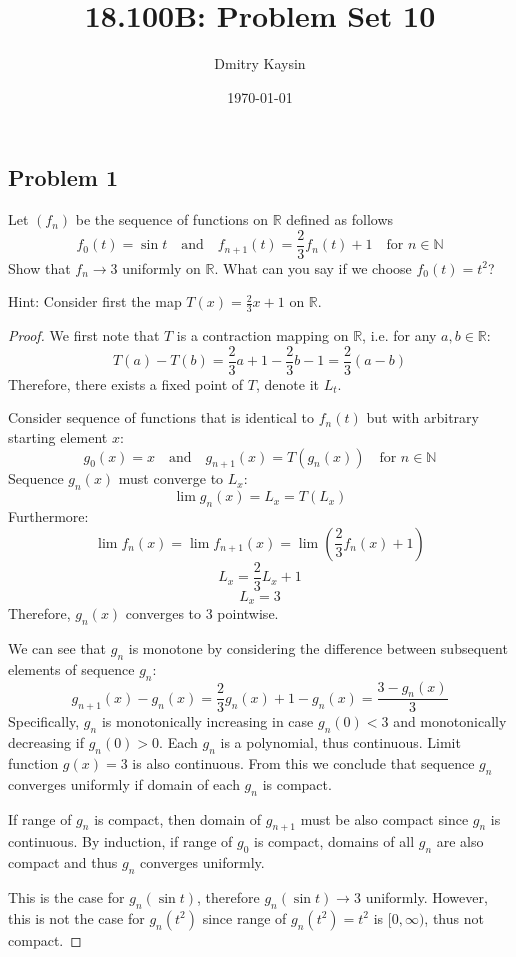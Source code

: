 \documentclass{article}
\title{18.100B: Problem Set 10}
\author{Dmitry Kaysin}
\date\today
\begin{document}
\maketitle 


\subsection*{Problem 1}

\begin{tcolorbox}
Let $(f_n)$ be the sequence of functions on $\mathbb{R}$ defined as follows
$$ f_0(t) = \sin t \>\>\> \text{ and } \>\>\> f_{n+1}(t) = \frac{2}{3}f_n(t)+1 \>\>\> \text{ for $n \in \mathbb{N}$} $$
Show that $f_n \to 3$ uniformly on $\mathbb{R}$. What can you say if we choose $f_0(t) = t^2$?

Hint: Consider first the map $T(x) = \frac{2}{3}x + 1$ on $\mathbb{R}$.
 \end{tcolorbox}
\begin{proof}
We first note that $T$ is a contraction mapping on $\mathbb{R}$, i.e. for any $a,b \in \mathbb{R}$:
$$ T(a) - T(b) = \frac{2}{3}a+1 - \frac{2}{3}b-1 = \frac{2}{3}(a-b) $$
Therefore, there exists a fixed point of $T$, denote it $L_t$.

Consider sequence of functions that is identical to $f_n(t)$ but with arbitrary starting element $x$:
$$ g_0(x) = x \>\>\> \text{ and } \>\>\> g_{n+1}(x) = T(g_n(x)) \>\>\> \text{ for $n \in \mathbb{N}$} $$
Sequence $g_n(x)$ must converge to $L_x$:
$$ \lim g_n(x) = L_x = T(L_x) $$
Furthermore:
$$ \lim f_{n}(x) = \lim f_{n+1}(x) = \lim \left( \frac{2}{3}f_n(x)+1 \right) $$
$$ L_x = \frac{2}{3} L_x +1 $$
$$ L_x = 3 $$
Therefore, $g_n(x)$ converges to $3$ pointwise.

We can see that $g_n$ is monotone by considering the difference between subsequent elements of sequence $g_n$:
$$ g_{n+1}(x) - g_n(x) = \frac{2}{3}g_n(x) + 1 - g_n(x) = \frac{3-g_n(x)}{3} $$
Specifically, $g_n$ is monotonically increasing in case $g_n(0) < 3$ and monotonically decreasing if $g_n(0) > 0$. Each $g_n$ is a polynomial, thus continuous. Limit function $g(x)=3$ is also continuous. From this we conclude that sequence $g_n$ converges uniformly if domain of each $g_n$ is compact.

If range of $g_n$ is compact, then domain of $g_{n+1}$ must be also compact since $g_n$ is continuous. By induction, if range of $g_0$ is compact, domains of all $g_n$ are also compact and thus $g_n$ converges uniformly.

This is the case for $g_n(\sin t)$, therefore $g_n(\sin t) \to 3$ uniformly. However, this is not the case for $g_n(t^2)$ since range of $g_n(t^2) = t^2$ is $[0,\infty)$, thus not compact.

\end{proof}
\end{document}
